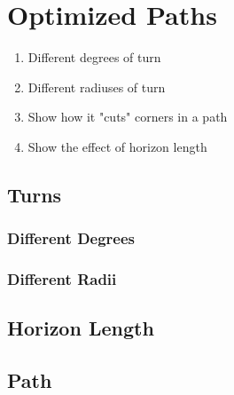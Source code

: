 \chapter{Optimized Paths}

\begin{enumerate}
		\item Different degrees of turn
		\item Different radiuses of turn
		\item Show how it "cuts" corners in a path
		\item Show the effect of horizon length
	\end{enumerate}


\section{Turns}

\subsection{Different Degrees}

\subsection{Different Radii}


\section{Horizon Length}


\section{Path}
